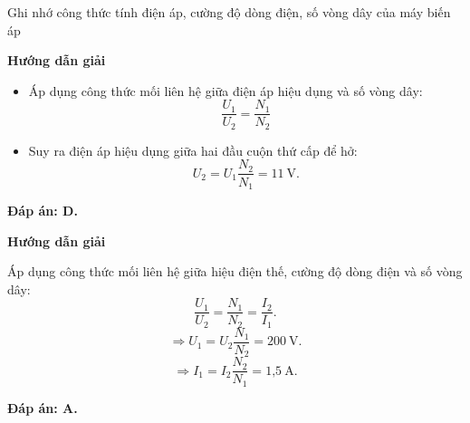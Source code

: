 \begin{dang}{Ghi nhớ công thức tính điện áp, cường độ dòng điện, số vòng dây của máy biến áp}
	{\begin{center}
			\textbf{Hướng dẫn giải}
		\end{center}
		
		\begin{itemize}
			\item Áp dụng công thức mối liên hệ giữa điện áp hiệu dụng và số vòng dây:
			\begin{equation*}
				\dfrac{U_1}{U_2}=\dfrac{N_1}{N_2}
			\end{equation*}
			\item Suy ra điện áp hiệu dụng giữa hai đầu cuộn thứ cấp để hở:
			\begin{equation*}
				U_2=U_1 \dfrac{N_2}{N_1} = 11\ \text{V}.
			\end{equation*}
		\end{itemize}
		
		
		\textbf{Đáp án: D.}
	}
	
	{\begin{center}
			\textbf{Hướng dẫn giải}
		\end{center}
		
		Áp dụng công thức mối liên hệ giữa hiệu điện thế, cường độ dòng điện và số vòng dây:
			\begin{equation*}
				\dfrac{U_1}{U_2}=\dfrac{N_1}{N_2}=\dfrac{I_2}{I_1}.
			\end{equation*}
			\begin{equation*}
				\Rightarrow U_1=U_2 \dfrac{N_1}{N_2}= 200\ \text{V}.
			\end{equation*}
			\begin{equation*}
				\Rightarrow I_1=I_2 \dfrac{N_2}{N_1}= \text{1,5}\ \text{A}.
			\end{equation*}
		
		\textbf{Đáp án: A.}
	}
	
\end{dang}
